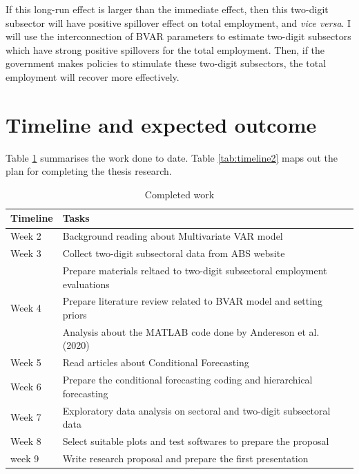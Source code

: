 \documentclass[11pt,a4paper,]{article}
\begin{document}
If this long-run effect is larger than the immediate effect, then this two-digit subsector will have positive spillover effect on total employment, and \emph{vice versa}. I will use the interconnection of BVAR parameters to estimate two-digit subsectors which have strong positive spillovers for the total employment. Then, if the government makes policies to stimulate these two-digit subsectors, the total employment will recover more effectively.

\newpage

\hypertarget{timeline-and-expected-outcome}{%
\section{Timeline and expected outcome}\label{timeline-and-expected-outcome}}

Table \ref{tab:timeline1} summarises the work done to date. Table \ref{tab:timeline2} maps out the plan for completing the thesis research.

\begin{table}

\caption{\label{tab:timeline1}Completed work}
\centering
\begin{tabular}[t]{ll}
\toprule
Timeline & Tasks\\
\midrule
Week 2 & Background reading about Multivariate VAR model\\
Week 3 & Collect two-digit subsectoral data from ABS website\\
 & Prepare materials reltaed to two-digit subsectoral employment evaluations\\
Week 4 & Prepare literature review related to BVAR model and setting priors\\
 & Analysis about the MATLAB code done by Andereson et al. (2020)\\
\addlinespace
Week 5 & Read articles about Conditional Forecasting\\
Week 6 & Prepare the conditional forecasting coding and hierarchical forecasting\\
Week 7 & Exploratory data analysis on sectoral and two-digit subsectoral data\\
Week 8 & Select suitable plots and test softwares to prepare the proposal\\
week 9 & Write research proposal and prepare the first presentation\\
\bottomrule
\end{tabular}
\end{table}
\end{document}
